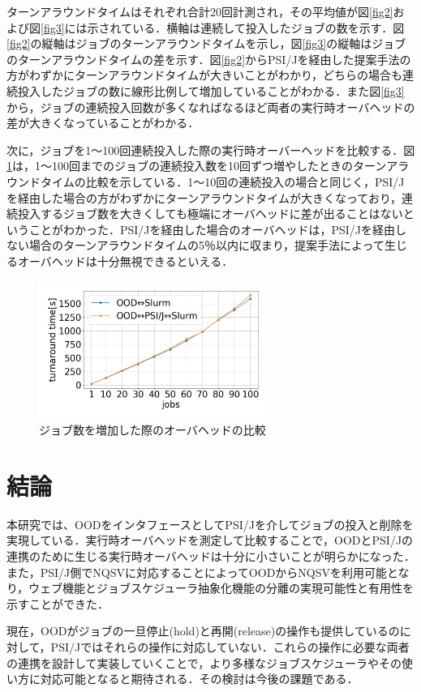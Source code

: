 \documentclass[a4paper,oneside,twocolumn,notitlepage,dvipdfmx]{jsarticle}
\begin{document}
\vspace{3\baselineskip}
ターンアラウンドタイムはそれぞれ合計20回計測され，その平均値が図\ref{fig2}および図\ref{fig3}には示されている．横軸は連続して投入したジョブの数を示す．図\ref{fig2}の縦軸はジョブのターンアラウンドタイムを示し，図\ref{fig3}の縦軸はジョブのターンアラウンドタイムの差を示す．図\ref{fig2}からPSI/Jを経由した提案手法の方がわずかにターンアラウンドタイムが大きいことがわかり，どちらの場合も連続投入したジョブの数に線形比例して増加していることがわかる．また図\ref{fig3}から，ジョブの連続投入回数が多くなればなるほど両者の実行時オーバヘッドの差が大きくなっていることがわかる．\par
次に，ジョブを1～100回連続投入した際の実行時オーバーヘッドを比較する．図\ref{fig5}は，1～100回までのジョブの連続投入数を10回ずつ増やしたときのターンアラウンドタイムの比較を示している．1～10回の連続投入の場合と同じく，PSI/Jを経由した場合の方がわずかにターンアラウンドタイムが大きくなっており，連続投入するジョブ数を大きくしても極端にオーバヘッドに差が出ることはないということがわかった．PSI/Jを経由した場合のオーバヘッドは，PSI/Jを経由しない場合のターンアラウンドタイムの5％以内に収まり，提案手法によって生じるオーバヘッドは十分無視できるといえる．\par

\begin{figure}[h]
  \centering
  \includegraphics[width=75mm]{./fig/100jobs.png}
  \vspace{-10pt}
  \caption{ジョブ数を増加した際のオーバヘッドの比較}
  \label{fig5}
\end{figure}

\vspace{3\baselineskip}
\section{結論}
本研究では、OODをインタフェースとしてPSI/Jを介してジョブの投入と削除を実現している．実行時オーバヘッドを測定して比較することで，OODとPSI/Jの連携のために生じる実行時オーバヘッドは十分に小さいことが明らかになった．また，PSI/J側でNQSVに対応することによってOODからNQSVを利用可能となり，ウェブ機能とジョブスケジューラ抽象化機能の分離の実現可能性と有用性を示すことができた．\par
現在，OODがジョブの一旦停止(hold)と再開(release)の操作も提供しているのに対して，PSI/Jではそれらの操作に対応していない．これらの操作に必要な両者の連携を設計して実装していくことで，より多様なジョブスケジューラやその使い方に対応可能となると期待される．その検討は今後の課題である．\par

\vspace{3\baselineskip}


\end{document}
